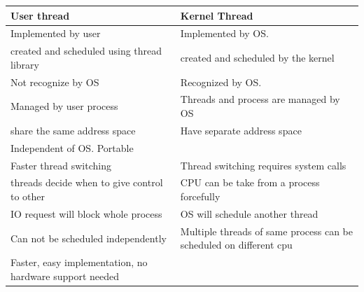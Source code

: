 \begin{enumerate}
  \begin{myTableStyle}
    \begin{tabular}{ |m{8cm}|m{8cm}| } \hline
        User thread                                 &     Kernel Thread                                   \\ \hline
        Implemented by user                         &     Implemented by OS.                              \\ \hline
        created and scheduled using thread library  &     created and scheduled by the kernel             \\ \hline
        Not recognize by OS                         &     Recognized by OS.                               \\ \hline
        Managed by user process                     &     Threads and process are managed by OS           \\ \hline
        share the same address space                &     Have separate address space                     \\ \hline
        Independent of OS. Portable                 &                                                     \\ \hline
        Faster thread switching                     &     Thread switching requires system calls          \\ \hline
        threads decide when to give control to other&     CPU can be take from a process forcefully       \\ \hline
        IO request will block whole process         &     OS will schedule another thread                 \\ \hline
        Can not be scheduled independently          &     Multiple threads of same process can be scheduled on different cpu          \\ \hline
        Faster, easy implementation, no hardware support needed&            \\ \hline
    \end{tabular}
  \end{myTableStyle}
  \vspace{0.08in}

\end{enumerate}








